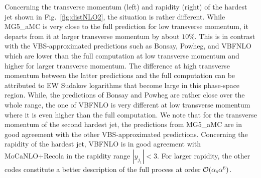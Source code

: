 Concerning the transverse momentum (left) and rapidity (right) of the hardest jet shown in Fig.~\ref{fig:distNLO2}, the situation is rather different.
While {\sc MG5\_aMC} is very close to the full prediction for low transverse momentum, it departs from it 
at larger transverse momentum by about $10\%$.
This is in contrast with the VBS-approximated predictions such as {\sc Bonsay}, {\sc Powheg}, and {\sc VBFNLO} which are lower than the full computation at low transverse momentum and higher for larger transverse momentum.
The difference at high transverse momentum between the latter predictions and the full computation can be attributed to EW Sudakov logarithms that become large in this phase-space region.
While, the predictions of {\sc Bonsay} and {\sc Powheg} are rather close over the whole range, the one of {\sc VBFNLO} is very different at low transverse momentum where it is even higher than the full computation.
We note that for the transverse momentum of the second hardest jet, the predictions from {\sc MG5\_aMC} are in good agreement with the other VBS-approximated predictions.
Concerning the rapidity of the hardest jet, {\sc VBFNLO} is in good agreement with {\sc MoCaNLO}+{\sc Recola} in the rapidity range $|y_{j_1}| < 3$.
For larger rapidity, the other codes constitute a better description of the full process at order $\mathcal{O}(\alpha_{\rm s}\alpha^6)$.

